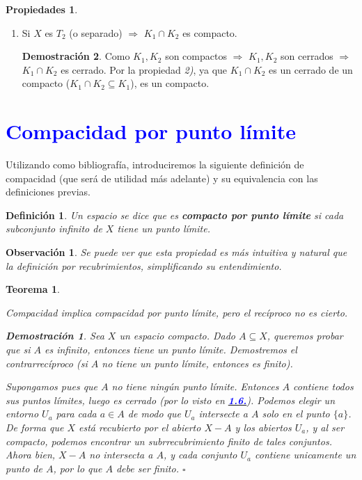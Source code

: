 \documentclass[12pt,twoside]{report}
\theoremstyle{azul}
\newtheorem*{demx}{Demostración}
\newtheorem*{defix}{Definición}
\newtheorem*{teox}{Teorema}
\theoremstyle{azul2}
\newtheorem*{obsx}{Observación}
\theoremstyle{plain}
\theoremstyle{definition}
\newtheorem*{propi}{Propiedades}
\newtheorem*{dem}{Demostración}
\theoremstyle{remark}
\begin{document}
\begin{propi}
\begin{enumerate}[1)]
\begin{dem}
    \end{dem}
    \item Si $X$ es $T_2$ (o separado) $\Rightarrow$ $K_1 \cap K_2$ es compacto.
    \begin{dem}
    Como $K_1, K_2$ son compactos $\Rightarrow$ $K_1, K_2$ son cerrados $\Rightarrow$ $K_1 \cap K_2$ es cerrado. Por la propiedad \textit{2)}, ya que $K_1 \cap K_2$ es un cerrado de un compacto ($K_1\cap K_2 \subseteq K_1$),  es un compacto.
    \end{dem}
\end{enumerate}
\end{propi}

\section{\textcolor{blue}{Compacidad por punto límite}} \label{lim}

Utilizando \cite[pág. 203]{Mun} como bibliografía, introduciremos la siguiente definición de compacidad (que será de utilidad más adelante) y su equivalencia con las definiciones previas.
\begin{defix}
Un espacio se dice que es \textbf{compacto por punto límite} si cada subconjunto infinito de $X$ tiene un punto límite.
\end{defix}
\begin{obsx}
Se puede ver que esta propiedad es más intuitiva y natural que la definición por recubrimientos, simplificando su entendimiento.
\end{obsx}
\begin{teox}
\:
\begin{tcolorbox}[colframe=blue, colback=blue!5!white]
Compacidad implica compacidad por punto límite, pero el recíproco no es cierto.
\end{tcolorbox}
\begin{demx}
Sea $X$ un espacio compacto. Dado $A \subseteq X$, queremos probar que si $A$ es infinito, entonces tiene un punto límite. Demostremos el contrarrecíproco (si $A$ no tiene un punto límite, entonces es finito).

Supongamos pues que $A$ no tiene ning{\'u}n punto límite. Entonces $A$ contiene todos sus puntos límites, luego es cerrado (por lo visto en \hyperref[ais]{\textcolor{blue}{\textbf{1.6.}}}). Podemos elegir un entorno $U_a$ para cada $a \in A$ de modo que $U_a$ intersecte a $A$ solo en el punto $\{a\}$. De forma que $X$ está recubierto por el abierto $X - A$ y los abiertos $U_a$, y al ser compacto, podemos encontrar un subrrecubrimiento finito de tales conjuntos. Ahora bien, $X-A$ no intersecta a $A$, y cada conjunto $U_a$ contiene unicamente un punto de $A$, por lo que $A$ debe ser finito. \hfill $\square$  
\end{demx}
\end{teox}
\end{document}
